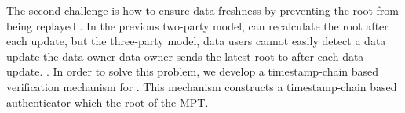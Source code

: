 The second challenge is how to ensure data freshness by preventing the root from being replayed . In the previous two-party model,  can recalculate the root after each update, but  the three-party model, data users cannot easily detect a data update  the data owner data owner sends the latest root to  after each data update. .
In order to solve this problem, we develop a timestamp-chain based verification mechanism for \name. This mechanism constructs a timestamp-chain based authenticator which  the root of the MPT. 
%
%
